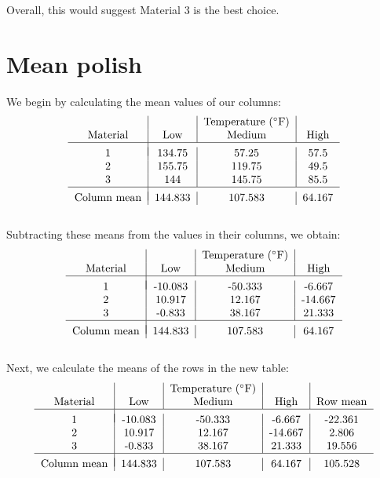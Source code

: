 \documentclass[]{article}
\begin{document}
Overall, this would suggest Material 3 is the best choice.

\section{Mean polish}
We begin by calculating the mean values of our columns:
\begin{displaymath}
    \begin{tabular}{c|c|c|c}
        &&Temperature ($^\circ$F)&\\
        Material&Low&Medium&High\\
        \hline\\
        [\dimexpr-\normalbaselineskip+4pt]
        1&134.75&57.25&57.5\\
        2&155.75&119.75&49.5\\
        3&144&145.75&85.5\\
        \hline\\
        [\dimexpr-\normalbaselineskip+4pt]
        Column mean&144.833&107.583&64.167
    \end{tabular}
\end{displaymath}
\\
Subtracting these means from the values in their columns, we obtain:
\begin{displaymath}
    \begin{tabular}{c|c|c|c}
        &&Temperature ($^\circ$F)&\\
        Material&Low&Medium&High\\
        \hline\\
        [\dimexpr-\normalbaselineskip+4pt]
        1&-10.083&-50.333&-6.667\\
        2&10.917&12.167&-14.667\\
        3&-0.833&38.167&21.333\\
        \hline\\
        [\dimexpr-\normalbaselineskip+4pt]
        Column mean&144.833&107.583&64.167
    \end{tabular}
\end{displaymath}
\\
Next, we calculate the means of the rows in the new table:
\begin{displaymath}
    \begin{tabular}{c|c|c|c|c}
        &&Temperature ($^\circ$F)&\\
        Material&Low&Medium&High&Row mean\\
        \hline\\
        [\dimexpr-\normalbaselineskip+4pt]
        1&-10.083&-50.333&-6.667&-22.361\\
        2&10.917&12.167&-14.667&2.806\\
        3&-0.833&38.167&21.333&19.556\\
        \hline\\
        [\dimexpr-\normalbaselineskip+4pt]
        Column mean&144.833&107.583&64.167&105.528
    \end{tabular}
\end{displaymath}
\end{document}
